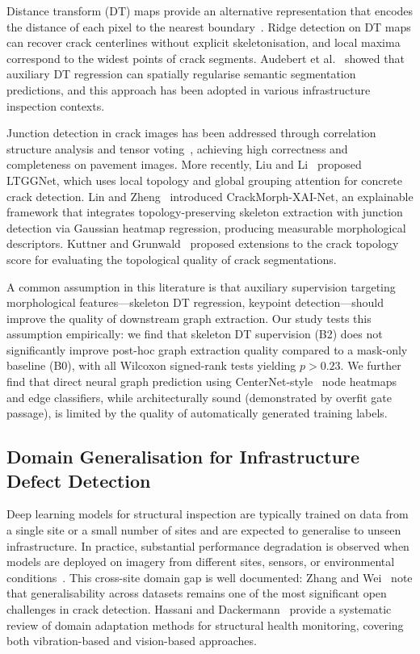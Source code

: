 Distance transform (DT) maps provide an alternative representation that encodes the distance of each pixel to the nearest boundary~\cite{audebert2019distance}. Ridge detection on DT maps can recover crack centerlines without explicit skeletonisation, and local maxima correspond to the widest points of crack segments. Audebert et al.~\cite{audebert2019distance} showed that auxiliary DT regression can spatially regularise semantic segmentation predictions, and this approach has been adopted in various infrastructure inspection contexts.

Junction detection in crack images has been addressed through correlation structure analysis and tensor voting~\cite{sun2019crackjunction}, achieving high correctness and completeness on pavement images. More recently, Liu and Li~\cite{liu2024ltggnet} proposed LTGGNet, which uses local topology and global grouping attention for concrete crack detection. Lin and Zheng~\cite{lin2025crackmorph} introduced CrackMorph-XAI-Net, an explainable framework that integrates topology-preserving skeleton extraction with junction detection via Gaussian heatmap regression, producing measurable morphological descriptors. Kuttner and Grunwald~\cite{kuttner2025cracktopo} proposed extensions to the crack topology score for evaluating the topological quality of crack segmentations.

A common assumption in this literature is that auxiliary supervision targeting morphological features---skeleton DT regression, keypoint detection---should improve the quality of downstream graph extraction. Our study tests this assumption empirically: we find that skeleton DT supervision (B2) does not significantly improve post-hoc graph extraction quality compared to a mask-only baseline (B0), with all Wilcoxon signed-rank tests yielding $p > 0.23$. We further find that direct neural graph prediction using CenterNet-style~\cite{zhou2019centernet} node heatmaps and edge classifiers, while architecturally sound (demonstrated by overfit gate passage), is limited by the quality of automatically generated training labels.

\subsection{Domain Generalisation for Infrastructure Defect Detection}
\label{sec:rw_dg}

Deep learning models for structural inspection are typically trained on data from a single site or a small number of sites and are expected to generalise to unseen infrastructure. In practice, substantial performance degradation is observed when models are deployed on imagery from different sites, sensors, or environmental conditions~\cite{koch2015review, bukhsh2021damage}. This cross-site domain gap is well documented: Zhang and Wei~\cite{zhang2025crackreview} note that generalisability across datasets remains one of the most significant open challenges in crack detection. Hassani and Dackermann~\cite{hassani2025dashm} provide a systematic review of domain adaptation methods for structural health monitoring, covering both vibration-based and vision-based approaches.

